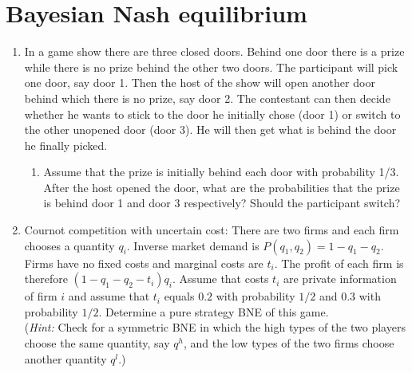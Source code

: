 \documentclass[a4paper,12pt]{article}
\begin{document}
\section{Bayesian Nash equilibrium}
\label{sec:bayes-nash-equil}

\begin{enumerate}[resume]
\item In a game show there are three closed doors. Behind one door there is a prize while there is no prize behind the other two doors. The participant will pick one door, say door 1. Then the host of the show will open another door behind which there is no prize, say door 2. The contestant can then decide whether he wants to stick to the door he initially chose (door 1) or switch to the other unopened door (door 3). He will then get what is behind the door he finally picked.
  \begin{enumerate}
  \item Assume that the prize is initially behind each door with probability 1/3. After the host opened the door, what are the probabilities that the prize is behind door 1 and door 3 respectively? Should the participant switch?
  \end{enumerate}
\item Cournot competition with uncertain cost: There are two firms and each firm chooses a quantity $q_i$. Inverse market demand is $P(q_1,q_2)=1-q_1-q_2$. Firms have no fixed costs and marginal costs are $t_i$. The profit of each firm is therefore $(1-q_1-q_2-t_i)q_i$. Assume that costs $t_i$ are private information of firm $i$ and assume that $t_i$ equals $0.2$ with probability $1/2$ and $0.3$ with probability $1/2$. Determine a pure strategy BNE of this game.\\
  (\emph{Hint: }Check for a symmetric BNE in which the high types of the two players choose the same quantity, say $q^h$, and the low types of the two firms choose another quantity $q^l$.)

\end{enumerate}
\end{document}
